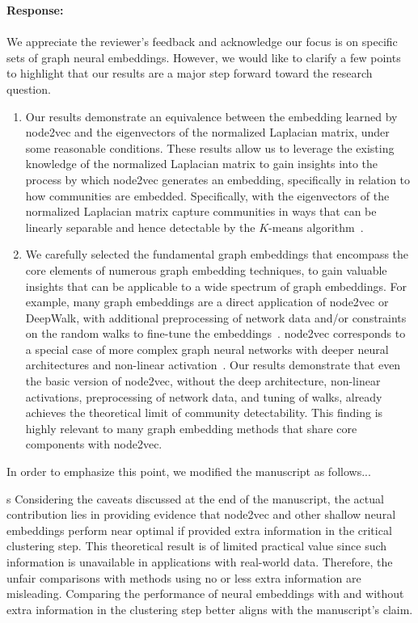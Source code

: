 \documentclass[12pt]{article}
\newcounter{comment}[subsection]
\newcommand{\response}[1]{{\noindent \textbf{Response:} \\ \\ \noindent #1}}
\newcommand{\rcomment}[1]{%
\vspace{10pt}
\begin{sectionbox}
s #1
\end{sectionbox}
}
\begin{document}
\response{
We appreciate the reviewer's feedback and acknowledge our focus is on specific sets of graph neural embeddings. However, we would like to clarify a few points to highlight that our results are a major step forward toward the research question.
\begin{enumerate}
\item 
Our results demonstrate an equivalence between the embedding learned by node2vec and the eigenvectors of the normalized Laplacian matrix, under some reasonable conditions. 
These results allow us to leverage the existing knowledge of the normalized Laplacian matrix to gain insights into the process by which node2vec generates an embedding, specifically in relation to how communities are embedded. 
Specifically, with the eigenvectors of the normalized Laplacian matrix capture communities in ways that can be linearly separable and hence detectable by the $K$-means algorithm~\cite{vonluxburgTutorialSpectralClustering2007}. 

\item 
We carefully selected the fundamental graph embeddings that encompass the core elements of numerous graph embedding techniques, to gain valuable insights that can be applicable to a wide spectrum of graph embeddings.
For example, many graph embeddings are a direct application of node2vec or DeepWalk, with additional preprocessing of network data and/or constraints on the random walks to fine-tune the embeddings~\cite{Khajehnejad2021-qh,Perozzi2017-gk,dong2017metapath2vec,Peng2021-uj,Kojaku2021a,Murray2020UnsupervisedEO}.
node2vec corresponds to a special case of more complex graph neural networks with deeper neural architectures and non-linear activation~\cite{hamiltonInductiveRepresentationLearning2017,Zhang2019AttributedNE}.
Our results demonstrate that even the basic version of node2vec, without the deep architecture, non-linear activations, preprocessing of network data, and tuning of walks, already achieves the theoretical limit of community detectability. This finding is highly relevant to many graph embedding methods that share core components with node2vec.
\end{enumerate}
In order to emphasize this point, we modified the manuscript as follows...
}

\rcomment{
Considering the caveats discussed at the end of the manuscript, the actual contribution lies in providing evidence that node2vec and other shallow neural embeddings perform near optimal if provided extra information in the critical clustering step. This theoretical result is of limited practical value since such information is unavailable in applications with real-world data. Therefore, the unfair comparisons with methods using no or less extra information are misleading. Comparing the performance of neural embeddings with and without extra information in the clustering step better aligns with the manuscript's claim. 
}
\end{document}
